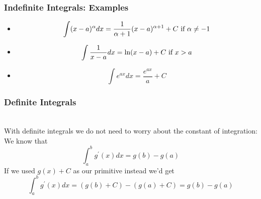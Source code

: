 \documentclass{beamer}
\numberwithin{equation}{section}
\begin{document}
\begin{frame}
\frametitle{Indefinite Integrals: Examples}

\begin{itemize}
\item [1'] $$\int (x-a)^\alpha dx = \frac{1}{\alpha+1} (x-a)^{\alpha+1}+C \hbox{ if }\alpha\not=-1$$ \pause

\item [2'] $$\int \frac{1}{x - a} dx=\ln (x-a)+C \hbox{ if }x>a$$ \pause

\item [3'] $$\int e^{ax} dx =\frac{e^{ax}}{a} +C$$ 
\end{itemize}

\end{frame}



\begin{frame}
\frametitle{Definite Integrals}

\ \\With definite integrals we do not need to worry about the constant of integration: \pause We know that $$\int_a^b g^\prime(x) dx=g(b)-g(a)$$ \pause If we used $g(x)+C$ as our primitive instead we'd get \pause $$\int_a^b g^\prime(x) dx=(g(b) +C)-(g(a)+C)=g(b)-g(a)$$


\end{frame}
\end{document}
